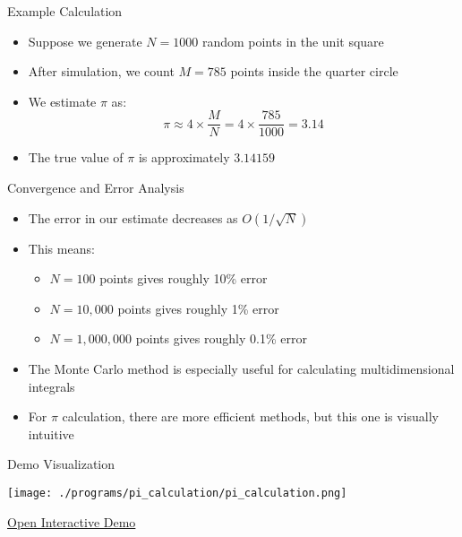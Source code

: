\begin{frame}{Example Calculation}
  \begin{itemize}
    \item Suppose we generate $N = 1000$ random points in the unit square
    \item After simulation, we count $M = 785$ points inside the quarter circle
    \item We estimate $\pi$ as:
          \[ \pi \approx 4 \times \frac{M}{N} = 4 \times \frac{785}{1000} = 3.14 \]
    \item The true value of $\pi$ is approximately $3.14159$ \parencite{beckmann1971history}
  \end{itemize}
\end{frame}

\begin{frame}{Convergence and Error Analysis}
  \begin{itemize}
    \item The error in our estimate decreases as $O(1/\sqrt{N})$ \parencite{kalos2008monte}
    \item This means:
          \begin{itemize}
            \item $N=100$ points gives roughly 10\% error
            \item $N=10,000$ points gives roughly 1\% error
            \item $N=1,000,000$ points gives roughly 0.1\% error
          \end{itemize}
    \item The Monte Carlo method is especially useful for calculating multidimensional integrals \parencite{MonteCarloCookson2005}
    \item For $\pi$ calculation, there are more efficient methods, but this one is visually intuitive
  \end{itemize}
\end{frame}

\begin{frame}{Demo Visualization}
  \begin{center}
    \texttt{[image: ./programs/pi\_calculation/pi\_calculation.png]}

    \vspace{0.5cm}
    \href{./programs/pi_calculation/pi_calculation.html}{Open Interactive Demo}
    \end{center}
\end{frame}
